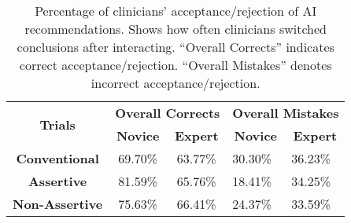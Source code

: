 \begin{table}[htpb]
\centering
\begin{tabular}{|c|cc|ll|}
\hline
\multirow{2}{*}{\textbf{Trials}} & \multicolumn{2}{c|}{\textbf{Overall Corrects}} & \multicolumn{2}{c|}{\textbf{Overall Mistakes}} \\ \cline{2-5} 
                & \multicolumn{1}{c|}{\textbf{Novice}}         & \multicolumn{1}{c|}{\textbf{Expert}}        & \multicolumn{1}{c|}{\textbf{Novice}}         & \multicolumn{1}{c|}{\textbf{Expert}}        \\ \hline
\textbf{Conventional}        & \multicolumn{1}{c|}{{\color[HTML]{9A0000} 69.70\%}}       & {\color[HTML]{9A0000} 63.77\%}      & \multicolumn{1}{l|}{{\color[HTML]{9A0000} 30.30\%}}       & {\color[HTML]{9A0000} 36.23\%}      \\ \hline
\textbf{Assertive}           & \multicolumn{1}{c|}{{\color[HTML]{009901} 81.59\%}}       & 65.76\%      & \multicolumn{1}{l|}{{\color[HTML]{009901} 18.41\%}}       & 34.25\%      \\ \hline
\textbf{Non-Assertive}       & \multicolumn{1}{c|}{75.63\%}       & {\color[HTML]{009901} 66.41\%}      & \multicolumn{1}{l|}{24.37\%}       & {\color[HTML]{009901} 33.59\%}      \\ \hline
\end{tabular}%
\caption{Percentage of clinicians' acceptance/rejection of \acs{AI} recommendations. Shows how often clinicians switched conclusions after interacting. ``Overall Corrects'' indicates correct acceptance/rejection. ``Overall Mistakes'' denotes incorrect acceptance/rejection.}
\label{tab:tab018}
\end{table}